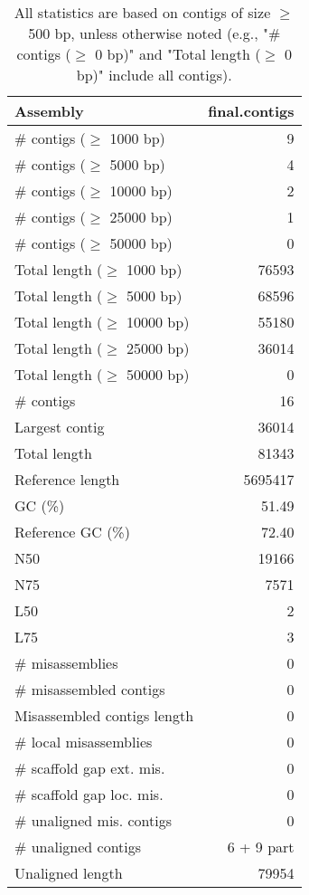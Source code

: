 \documentclass[12pt,a4paper]{article}
\begin{document}
\begin{table}[ht]
\begin{center}
\caption{All statistics are based on contigs of size $\geq$ 500 bp, unless otherwise noted (e.g., "\# contigs ($\geq$ 0 bp)" and "Total length ($\geq$ 0 bp)" include all contigs).}
\begin{tabular}{|l*{1}{|r}|}
\hline
Assembly & final.contigs \\ \hline
\# contigs ($\geq$ 1000 bp) & 9 \\ \hline
\# contigs ($\geq$ 5000 bp) & 4 \\ \hline
\# contigs ($\geq$ 10000 bp) & 2 \\ \hline
\# contigs ($\geq$ 25000 bp) & 1 \\ \hline
\# contigs ($\geq$ 50000 bp) & 0 \\ \hline
Total length ($\geq$ 1000 bp) & 76593 \\ \hline
Total length ($\geq$ 5000 bp) & 68596 \\ \hline
Total length ($\geq$ 10000 bp) & 55180 \\ \hline
Total length ($\geq$ 25000 bp) & 36014 \\ \hline
Total length ($\geq$ 50000 bp) & 0 \\ \hline
\# contigs & 16 \\ \hline
Largest contig & 36014 \\ \hline
Total length & 81343 \\ \hline
Reference length & 5695417 \\ \hline
GC (\%) & 51.49 \\ \hline
Reference GC (\%) & 72.40 \\ \hline
N50 & 19166 \\ \hline
N75 & 7571 \\ \hline
L50 & 2 \\ \hline
L75 & 3 \\ \hline
\# misassemblies & 0 \\ \hline
\# misassembled contigs & 0 \\ \hline
Misassembled contigs length & 0 \\ \hline
\# local misassemblies & 0 \\ \hline
\# scaffold gap ext. mis. & 0 \\ \hline
\# scaffold gap loc. mis. & 0 \\ \hline
\# unaligned mis. contigs & 0 \\ \hline
\# unaligned contigs & 6 + 9 part \\ \hline
Unaligned length & 79954 \\ \hline

\end{tabular}
\end{center}
\end{table}
\end{document}
